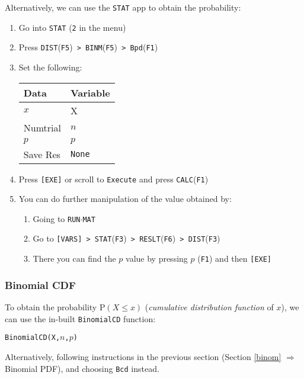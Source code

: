 \documentclass[a5paper,draft]{memoir}
\def\code#1{\texttt{#1}}
\newcommand{\addtoindex}[1]{#1\index{#1}}
\begin{document}
Alternatively, we can use the \code{STAT} app to obtain the probability:
\begin{enumerate}
	\item Go into \code{STAT} (\code{2} in the menu)
	\item Press \code{DIST}(\code{F5})\code{ > BINM}(\code{F5})\code{ > Bpd}(\code{F1})
	\item Set the following:
	\begin{center}
		\setlength{\tabcolsep}{10pt}
		\renewcommand{\arraystretch}{1.1}
		\begin{tabular}{|l|l|}
			\hline
			Data		& Variable \\
			\hline
			$x$			& X \\
			\hline
			Numtrial	& $n$ \\
			\hline
			$p$			& $p$ \\
			\hline
			Save Res	& \code{None} \\
			\hline
		\end{tabular}
	\end{center}
	\item Press \code{[EXE]} or scroll to \code{Execute} and press \code{CALC}(\code{F1})
	\item You can do further manipulation of the value obtained by:
	\begin{enumerate}
		\item Going to \code{RUN$\cdot$MAT}
		\item Go to \code{[VARS] > STAT}(\code{F3})\code{ > RESLT}(\code{F6})\code{ > DIST}(\code{F3})
		\item There you can find the $p$ value by pressing $p$ (\code{F1}) and then \code{[EXE]}
	\end{enumerate} 
\end{enumerate}

\subsubsection{Binomial CDF}

To obtain the probability $\textrm{P}(X \leq x)$ (\textit{cumulative distribution function} of $x$), we can use the in-built \code{\addtoindex{BinomialCD}} function:

\begin{center}
	\code{BinomialCD(X,$n$,$p$)}
\end{center}

Alternatively, following instructions in the previous section (Section \ref{binom} $\Rightarrow$ Binomial PDF), and choosing \code{Bcd} instead. 
\end{document}
